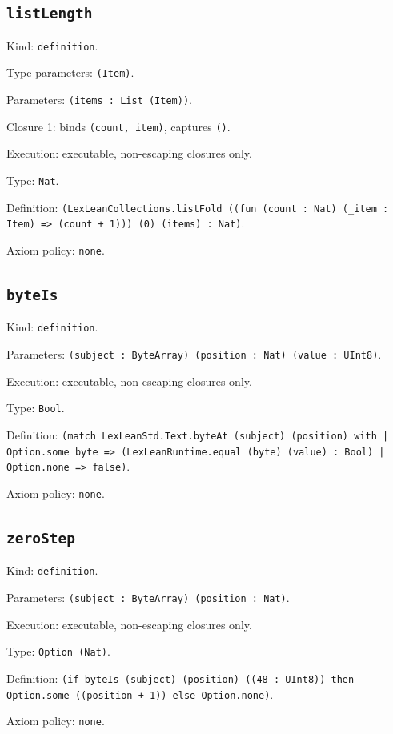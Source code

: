 \documentclass[11pt]{article}
\begin{document}
\subsection*{\texttt{listLength}}
\noindent Kind: \texttt{definition}.\par
\noindent Type parameters: \texttt{(Item)}.\par
\noindent Parameters: \texttt{(items : List (Item))}.\par
\noindent Closure 1: binds \texttt{(count, item)}, captures \texttt{()}.\par
\noindent Execution: executable, non-escaping closures only.\par
\noindent Type: \texttt{Nat}.\par
\noindent Definition: \texttt{(LexLeanCollections.listFold ((fun (count : Nat) (\_item : Item) => (count + 1))) (0) (items) : Nat)}.\par
\noindent Axiom policy: \texttt{none}.\par
\subsection*{\texttt{byteIs}}
\noindent Kind: \texttt{definition}.\par
\noindent Parameters: \texttt{(subject : ByteArray) (position : Nat) (value : UInt8)}.\par
\noindent Execution: executable, non-escaping closures only.\par
\noindent Type: \texttt{Bool}.\par
\noindent Definition: \texttt{(match LexLeanStd.Text.byteAt (subject) (position) with | Option.some byte => (LexLeanRuntime.equal (byte) (value) : Bool) | Option.none => false)}.\par
\noindent Axiom policy: \texttt{none}.\par
\subsection*{\texttt{zeroStep}}
\noindent Kind: \texttt{definition}.\par
\noindent Parameters: \texttt{(subject : ByteArray) (position : Nat)}.\par
\noindent Execution: executable, non-escaping closures only.\par
\noindent Type: \texttt{Option (Nat)}.\par
\noindent Definition: \texttt{(if byteIs (subject) (position) ((48 : UInt8)) then Option.some ((position + 1)) else Option.none)}.\par
\noindent Axiom policy: \texttt{none}.\par
\end{document}

